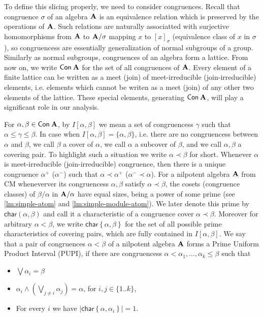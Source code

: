 \documentclass[11pt,a4paper]{amsart}
\newcommand{\m}[1]{{\uppercase {\bf{#1}}}}
\newcommand{\set}[1]{{\left\{ {#1} \right\} }}
\newcommand{\intv}[2]{I\left[#1,#2\right]}
\renewcommand{\leq}{\leqslant}
\newcommand{\con}[1]{{\sf Con\:\m{#1}}}
\newcounter{note}
\newcommand{\charr}{\mathsf{char}}
\newcommand{\charrset}[1]{\charr\set{#1}}
\begin{document}
To define this slicing properly, we need to consider congruences. Recall that congruence $\sigma$ of an algebra $\m A$ is an equivalence relation which is preserved by the operations of $\m A$. Such relations are naturally associatted with surjective homomorphisms from $\m A$ to $\m A/\sigma$ mapping $x$ to $[x]_{\sigma}$ (equivalence class of $x$ in $\sigma$), so congruencess are essentially generalization of normal subgroups of a group. Similarly as normal subgroups, congruences of an algebra form a lattice. From now on, we write $\con{\m A}$ for the set of all congruences of $\m A$. Every element of a finite lattice can be written as a meet (join) of meet-irreducible (join-irreducible) elements, i.e.\! elements which cannot be writen as a meet (join) of any other two elements of the lattice. These special elements, generating $\con A$, will play a significant role in our analysis.

For $\alpha, \beta \in \con{\m A}$, by $\intv{\alpha}{\beta}$ we mean a set of congruencess $\gamma$ such that $\alpha \leq \gamma \leq \beta$. In case when $\intv{\alpha}{\beta} = \{\alpha, \beta\}$, i.e.\! there are no congruencess between $\alpha$ and $\beta$, we call $\beta$ a cover of $\alpha$,  we call $\alpha$ a subcover of $\beta$, and we call $\alpha, \beta$ a covering pair. To highlight such a situation we write $\alpha \prec \beta$ for short. Whenever $\alpha$ is meet-irreducible (join-irreducible) congruence, then there is a unique congruence $\alpha^{+}$ ($\alpha^{-}$) such that $\alpha \prec \alpha^{+}$ ($\alpha^{-} \prec \alpha$). 
For a nilpotent algebra $\m A$  from CM wheneverver its congruencess $\alpha, \beta$ satisfy $\alpha \prec \beta$, the cosets (congruence classes) of $\beta/\alpha$ in $\m A/\alpha$ have equal sizes, being a power of some prime (see \cref{lm:simple-atom} and \cref{lm:simple-module-atom}). We later denote this prime by $\charr(\alpha, \beta)$ and call it a characteristic of a congruence cover $\alpha \prec \beta$. Moreover for arbitrary $\alpha < \beta$, we write $\charrset{\alpha, \beta}$ for the set of all possible prime characteristics of covering pairs, which are fully contained in $\intv{\alpha}{\beta}$.
We say that a pair of congruences $\alpha < \beta$ of a nilpotent algebra $\m A$ forms a Prime Uniform Product Interval (PUPI), if there are congruencess $\alpha < \alpha_1, \ldots, \alpha_k \leq \beta$ such that
\begin{itemize}
    \item $\bigvee \alpha_i = \beta$
    \item $\alpha_i \wedge (\bigvee_{j\neq i}\alpha_j) = \alpha$, for $i,j \in \{1..k\}$, \item For every $i$  we have $|\charrset{\alpha, \alpha_i}| = 1$.
\end{itemize}
\end{document}
